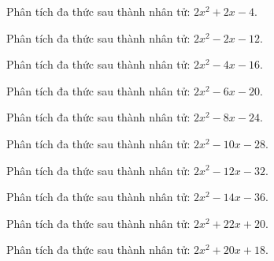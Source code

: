 \begin{bt}
	Phân tích đa thức sau thành nhân tử: $2 x^2 + 2 x - 4$.
\end{bt}
\begin{bt}
	Phân tích đa thức sau thành nhân tử: $2 x^2 - 2 x - 12$.
\end{bt}
\begin{bt}
	Phân tích đa thức sau thành nhân tử: $2 x^2 - 4 x - 16$.
\end{bt}
\begin{bt}
	Phân tích đa thức sau thành nhân tử: $2 x^2 - 6 x - 20$.
\end{bt}
\begin{bt}
	Phân tích đa thức sau thành nhân tử: $2 x^2 - 8 x - 24$.
\end{bt}
\begin{bt}
	Phân tích đa thức sau thành nhân tử: $2 x^2 - 10 x - 28$.
\end{bt}
\begin{bt}
	Phân tích đa thức sau thành nhân tử: $2 x^2 - 12 x - 32$.
\end{bt}
\begin{bt}
	Phân tích đa thức sau thành nhân tử: $2 x^2 - 14 x - 36$.
\end{bt}
\begin{bt}
	Phân tích đa thức sau thành nhân tử: $2 x^2 + 22 x + 20$.
\end{bt}
\begin{bt}
	Phân tích đa thức sau thành nhân tử: $2 x^2 + 20 x + 18$.
\end{bt}
